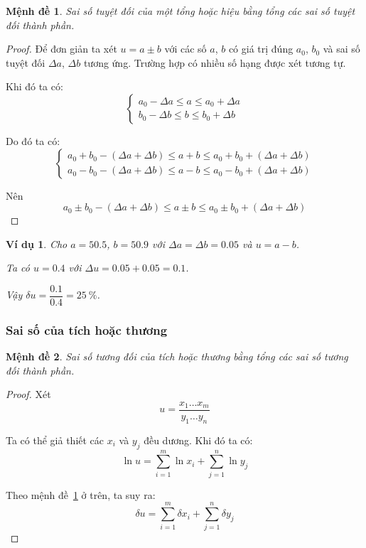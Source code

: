 \documentclass{book}
\newtheorem{exmp}{Ví dụ}[chapter]
\newtheorem*{proposition}{Mệnh đề}
\begin{document}
\begin{proposition}\label{prop:error_of_sum}
    Sai số tuyệt đối của một tổng hoặc hiệu bằng tổng các sai số tuyệt đối thành
    phần.
\end{proposition}
\begin{proof}
    Để đơn giản ta xét \(u = a \pm b\) với các số \(a\), \(b\) có giá trị đúng
    \(a_0\), \(b_0\) và sai số tuyệt đối \(\Delta a\), \(\Delta b\) tương ứng.
    Trường hợp có nhiều số hạng được xét tương tự.

    Khi đó ta có:
    \[\begin{cases}
        a_0 - \Delta a \leq a \leq a_0 + \Delta a \\
        b_0 - \Delta b \leq b \leq b_0 + \Delta b
    \end{cases}\]

    Do đó ta có:
    \[\begin{cases}
        a_0 + b_0 - (\Delta a + \Delta b) \leq a + b \leq a_0 + b_0 + (\Delta a + \Delta b) \\
        a_0 - b_0 - (\Delta a + \Delta b) \leq a - b \leq a_0 - b_0 + (\Delta a + \Delta b)
    \end{cases}\]

    Nên
    \[a_0 \pm b_0 - (\Delta a + \Delta b) \leq a \pm b \leq a_0 \pm b_0 + (\Delta a + \Delta b)\]
\end{proof}

\begin{exmp}
    Cho \(a = \num{50.5}\), \(b = \num{50.9}\) với \(\Delta a = \Delta b =
    \num{0.05}\) và \(u = a - b\).

    Ta có \(u = \num{0.4}\) với \(\Delta u = \num{0.05} + \num{0.05} =
    \num{0.1}\).

    Vậy \(\delta u = \dfrac{\num{0.1}}{\num{0.4}} = \SI{25}{\percent}\).
\end{exmp}

\subsubsection{Sai số của tích hoặc thương}

\begin{proposition}
    Sai số tương đối của tích hoặc thương bằng tổng các sai số tương đối thành
    phần.
\end{proposition}
\begin{proof}
    Xét
    \[u = \frac{x_1 \ldots x_m}{y_1 \ldots y_n}\]

    Ta có thể giả thiết các \(x_i\) và \(y_j\) đều dương. Khi đó ta có:
    \[\ln{u} = \sum_{i=1}^{m} \ln{x_i} + \sum_{j=1}^{n} \ln{y_j}\]

    Theo mệnh đề~\ref{prop:error_of_sum} ở trên, ta suy ra:
    \[\delta u = \sum_{i=1}^{m} \delta x_i + \sum_{j=1}^{n} \delta y_j\]
\end{proof}
\end{document}
